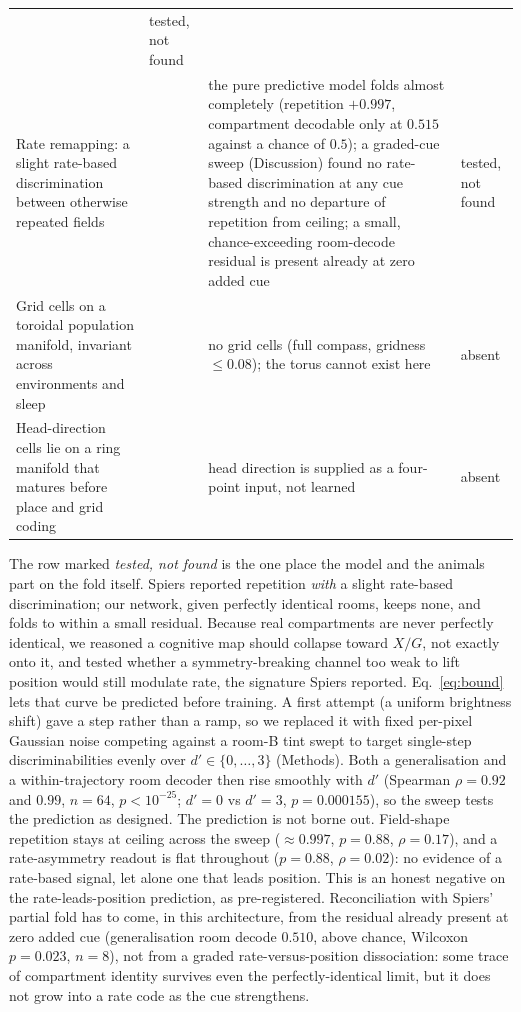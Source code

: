 \documentclass[9pt,lineno]{elife}
\begin{document}
\begin{table}[t]
\begin{tabular}{p{}p{}p{}p{}}
& tested, not found \\[4pt]
Rate remapping: a slight rate-based discrimination between otherwise repeated fields
& \citet{spiers2015} & the pure predictive model folds almost completely (repetition $+0.997$,
compartment decodable only at $0.515$ against a chance of $0.5$); a graded-cue sweep (Discussion) found no
rate-based discrimination at any cue strength and no departure of repetition from ceiling; a
small, chance-exceeding room-decode residual is present already at zero added cue
& tested, not found \\[4pt]
Grid cells on a toroidal population manifold, invariant across environments and sleep
& \citet{gardner2022toroidal} & no grid cells (full compass, gridness $\le 0.08$); the torus cannot exist here
& absent \\[4pt]
Head-direction cells lie on a ring manifold that matures before place and grid coding
& \citet{taube1990, langston2010} & head direction is supplied as a four-point input, not learned
& absent \\
\bottomrule
\end{tabular}
\end{table}

The row marked \emph{tested, not found} is the one place the model and the animals part on the fold
itself. Spiers reported repetition \emph{with} a slight rate-based discrimination; our network, given
perfectly identical rooms, keeps none, and folds to within a small residual. Because real compartments
are never perfectly identical, we reasoned a cognitive map should collapse toward $X/G$, not exactly
onto it, and tested whether a symmetry-breaking channel too weak to lift position would still modulate
rate, the signature Spiers reported. Eq.~\ref{eq:bound} lets that curve be predicted before training. A first
attempt (a uniform brightness shift) gave a step rather than a ramp, so we replaced it with fixed
per-pixel Gaussian noise competing against a room-B tint swept to target single-step discriminabilities
evenly over $d' \in \{0,\dots,3\}$ (Methods). Both a generalisation and a within-trajectory room decoder
then rise smoothly with $d'$ (Spearman $\rho = 0.92$ and $0.99$, $n = 64$, $p < 10^{-25}$; $d'=0$ vs
$d'=3$, $p = 0.000155$), so the sweep tests the prediction as designed. The prediction is not borne out.
Field-shape repetition stays at ceiling across the sweep ($\approx 0.997$, $p = 0.88$, $\rho = 0.17$),
and a rate-asymmetry readout is flat throughout ($p = 0.88$, $\rho = 0.02$): no evidence of a rate-based
signal, let alone one that leads position. This is an honest negative on the rate-leads-position
prediction, as pre-registered. Reconciliation with Spiers' partial fold has to come, in this
architecture, from the residual already present at zero added cue (generalisation room decode $0.510$,
above chance, Wilcoxon $p = 0.023$, $n = 8$), not from a graded rate-versus-position dissociation: some
trace of compartment identity survives even the perfectly-identical limit, but it does not grow into a
rate code as the cue strengthens.
\end{document}
